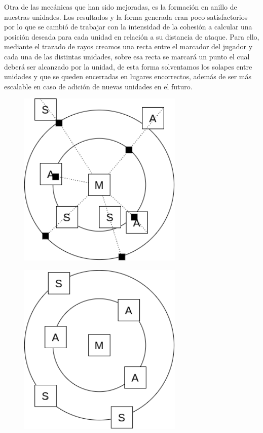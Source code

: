 Otra de las mecánicas que han sido mejoradas, es la formación en anillo de nuestras unidades. Los resultados
y la forma generada eran poco satisfactorios por lo que se cambió de trabajar con la intensidad de la cohesión
a calcular una posición deseada para cada unidad en relación a su distancia de ataque. Para ello, mediante el
trazado de rayos creamos una recta entre el marcador del jugador y cada una de las distintas unidades, sobre esa
recta se marcará un punto el cual deberá ser alcanzado por la unidad, de esta forma solventamos los solapes entre
unidades y que se queden encerradas en lugares encorrectos, además de ser más escalable en caso de adición de
nuevas unidades en el futuro.

\begin{figure}[ht]
\centering
\begin{minipage}[c]{0.42\linewidth}
	\hspace{9mm}
	\includegraphics[width=0.7\textwidth]{imagenes/diario_desarrollo/anillo2.png} \\
	\label{anillo2}
\end{minipage}
\begin{minipage}[c]{0.42\linewidth}
	\hspace{9mm}
	\includegraphics[width=0.7\textwidth]{imagenes/diario_desarrollo/anillo3.png} \\

\end{minipage}
\end{figure}
